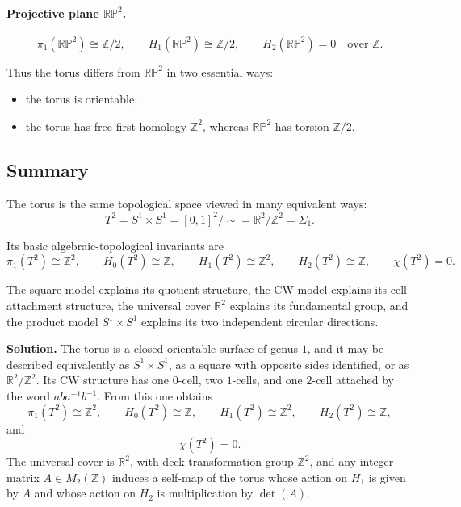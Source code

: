 \documentclass[12pt,a4paper]{article}
\theoremstyle{notespace}
\begin{document}
\paragraph{Projective plane \(\mathbb{RP}^2\).}
\[
\pi_1(\mathbb{RP}^2)\cong \mathbb Z/2,
\qquad
H_1(\mathbb{RP}^2)\cong \mathbb Z/2,
\qquad
H_2(\mathbb{RP}^2)=0
\quad\text{over }\mathbb Z.
\]

Thus the torus differs from \(\mathbb{RP}^2\) in two essential ways:

\begin{itemize}
	\item the torus is orientable,
	\item the torus has free first homology \(\mathbb Z^2\), whereas \(\mathbb{RP}^2\) has torsion \(\mathbb Z/2\).
\end{itemize}

\subsection{Summary}

The torus is the same topological space viewed in many equivalent ways:
\[
T^2=S^1\times S^1
=[0,1]^2/\sim
=\mathbb R^2/\mathbb Z^2
=\Sigma_1.
\]

Its basic algebraic-topological invariants are
\[
\pi_1(T^2)\cong \mathbb Z^2,
\qquad
H_0(T^2)\cong \mathbb Z,
\qquad
H_1(T^2)\cong \mathbb Z^2,
\qquad
H_2(T^2)\cong \mathbb Z,
\qquad
\chi(T^2)=0.
\]

The square model explains its quotient structure, the CW model explains its cell attachment structure, the universal cover \(\mathbb R^2\) explains its fundamental group, and the product model \(S^1\times S^1\) explains its two independent circular directions.

\bigskip

\textbf{Solution.}
The torus is a closed orientable surface of genus \(1\), and it may be described equivalently as \(S^1\times S^1\), as a square with opposite sides identified, or as \(\mathbb R^2/\mathbb Z^2\). Its CW structure has one \(0\)-cell, two \(1\)-cells, and one \(2\)-cell attached by the word \(aba^{-1}b^{-1}\). From this one obtains
\[
\pi_1(T^2)\cong \mathbb Z^2,
\qquad
H_0(T^2)\cong \mathbb Z,
\qquad
H_1(T^2)\cong \mathbb Z^2,
\qquad
H_2(T^2)\cong \mathbb Z,
\]
and
\[
\chi(T^2)=0.
\]
The universal cover is \(\mathbb R^2\), with deck transformation group \(\mathbb Z^2\), and any integer matrix \(A\in M_2(\mathbb Z)\) induces a self-map of the torus whose action on \(H_1\) is given by \(A\) and whose action on \(H_2\) is multiplication by \(\det(A)\).
\end{document}
